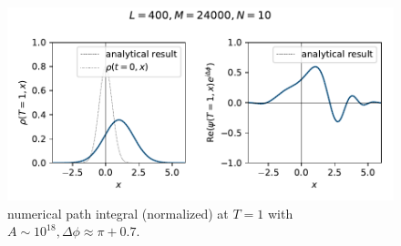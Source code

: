 \documentclass[10pt, a4paper]{article}
\numberwithin{equation}{section}
\begin{document}
\begin{itemize}
		\begin{figure}[H]
			\centering
			\includegraphics[scale=0.8]{figures/numerical path integral (normalized) of a free particle with initial state as a Gaussian wave packet and T=1 (L=400, M=24000, N=10).pdf}
			\caption{numerical path integral (normalized) at $T = 1$ with $A \sim 10^{18}, \Delta \phi \approx \pi + 0.7$.}
		\end{figure}
	\end{itemize}
	
\end{document}
